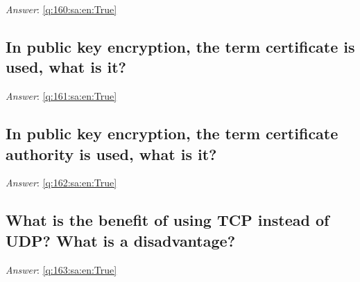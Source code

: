 \documentclass[a4paper,11pt,oneside]{article}
\begin{document}
\begin{sloppypar}
\label{q:160:sa:en:False}

\vspace{2cm}

\noindent\makebox[\textwidth]{\hrulefill}

\vspace{1cm}

\textit{Answer}: \autoref{q:160:sa:en:True}



\subsection{In public key encryption, the term certificate is used, what is it?}

\label{q:161:sa:en:False}

\vspace{2cm}

\noindent\makebox[\textwidth]{\hrulefill}

\vspace{1cm}

\textit{Answer}: \autoref{q:161:sa:en:True}



\subsection{In public key encryption, the term certificate authority is used, what is it?}

\label{q:162:sa:en:False}

\vspace{2cm}

\noindent\makebox[\textwidth]{\hrulefill}

\vspace{1cm}

\textit{Answer}: \autoref{q:162:sa:en:True}



\subsection{What is the benefit of using TCP instead of UDP? What is a disadvantage?}

\label{q:163:sa:en:False}

\vspace{2cm}

\noindent\makebox[\textwidth]{\hrulefill}

\vspace{1cm}

\textit{Answer}: \autoref{q:163:sa:en:True}




\end{sloppypar}
\end{document}
